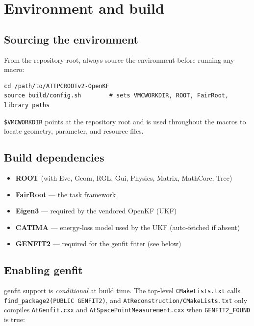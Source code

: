 \documentclass[11pt,a4paper]{article}
\newcommand{\code}[1]{\texttt{\small #1}}
\newcommand{\file}[1]{\texttt{\small #1}}
\begin{document}
\section{Environment and build}\label{sec:env}

\subsection{Sourcing the environment}

From the repository root, always source the environment before running any macro:

\begin{lstlisting}[style=bash]
cd /path/to/ATTPCROOTv2-OpenKF
source build/config.sh        # sets VMCWORKDIR, ROOT, FairRoot, library paths
\end{lstlisting}

\code{\$VMCWORKDIR} points at the repository root and is used throughout the
macros to locate geometry, parameter, and resource files.

\subsection{Build dependencies}

\begin{itemize}[nosep]
  \item \textbf{ROOT} (with Eve, Geom, RGL, Gui, Physics, Matrix, MathCore, Tree)
  \item \textbf{FairRoot} --- the task framework
  \item \textbf{Eigen3} --- required by the vendored OpenKF (UKF)
  \item \textbf{CATIMA} --- energy-loss model used by the UKF (auto-fetched if absent)
  \item \textbf{GENFIT2} --- required for the genfit fitter (see below)
\end{itemize}

\subsection{Enabling genfit}

genfit support is \emph{conditional} at build time. The top-level
\file{CMakeLists.txt} calls \code{find\_package2(PUBLIC GENFIT2)}, and
\file{AtReconstruction/\allowbreak CMakeLists.txt} only compiles \file{AtGenfit.cxx} and
\file{AtSpacePoint\allowbreak Measurement.cxx} when \code{GENFIT2\_FOUND} is true:
\end{document}
